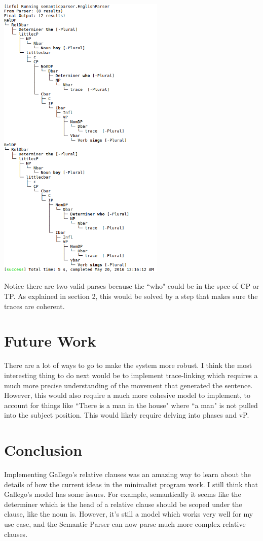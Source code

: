 \documentclass[11pt]{article}
\begin{document}
\includegraphics[width=0.6\textwidth]{trees.png}

Notice there are two valid parses because the ``who" could be in the spec of CP or TP. As explained
in section 2, this would be solved by a step that makes sure the traces are coherent.
\section{Future Work}
There are a lot of ways to go to make the system more robust. I think the most interesting thing to
do next would be to implement trace-linking which requires a much more precise understanding of the
movement that generated the sentence. However, this would also require a much more cohesive model
to implement, to account for things like ``There is a man in the house" where ``a man" is not pulled
into the subject position. This would likely require delving into phases and vP.

\section{Conclusion} %
Implementing Gallego's relative clauses was an amazing way to learn about the details of how the
current ideas in the minimalist program work. I still think that Gallego's model has some issues.
For example, semantically it seems like the determiner which is the head of a relative clause should
be scoped under the clause, like the noun is. However, it's still a model which works very well
for my use case, and the Semantic Parser can now parse much more complex relative clauses.
\end{document}
